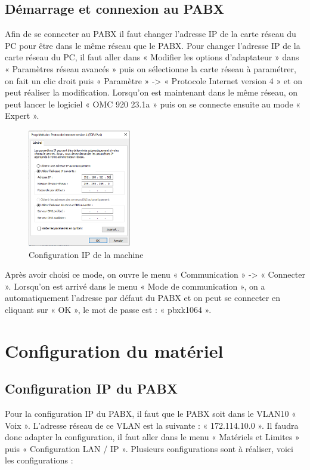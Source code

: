 \documentclass[12pt, a4paper]{article}
\begin{document}
	\subsection{Démarrage et connexion au PABX}

	Afin de se connecter au PABX il faut changer l’adresse IP de la carte réseau du PC
	pour être dans le même réseau que le PABX. Pour changer l’adresse IP de la carte réseau 
	du PC, il faut aller dans « Modifier les options d’adaptateur » dans « Paramètres réseau 
	avancés » puis on sélectionne la carte réseau à paramétrer, on fait un clic droit puis 
	« Paramètre » -> « Protocole Internet version 4 » et on peut réaliser la modification.
	Lorsqu’on est maintenant dans le même réseau, on peut lancer le logiciel « OMC 920 23.1a » 
	puis on se connecte ensuite au mode « Expert ».

	\begin{figure}[H]
		\centering
		\includegraphics[width=0.4\textwidth]{img/co.png}
		\caption{Configuration IP de la machine}
		\label{fig:co}
	\end{figure}

	Après avoir choisi ce mode, on ouvre le menu « Communication » -> « Connecter ».
	Lorsqu’on est arrivé dans le menu « Mode de communication », on a automatiquement
	l’adresse par défaut du PABX et on peut se connecter en cliquant sur « OK », le mot 
	de passe est : « pbxk1064 ».
	\newpage

\section{Configuration du matériel}

	\subsection{Configuration IP du PABX}

	Pour la configuration IP du PABX, il faut que le PABX soit dans le VLAN10 « Voix ». 
	L’adresse réseau de ce VLAN est la suivante : « 172.114.10.0 ». Il faudra donc adapter 
	la configuration, il faut aller dans le menu « Matériels et Limites » puis « Configuration 
	LAN / IP ». Plusieurs configurations sont à réaliser, voici les configurations :
\end{document}
